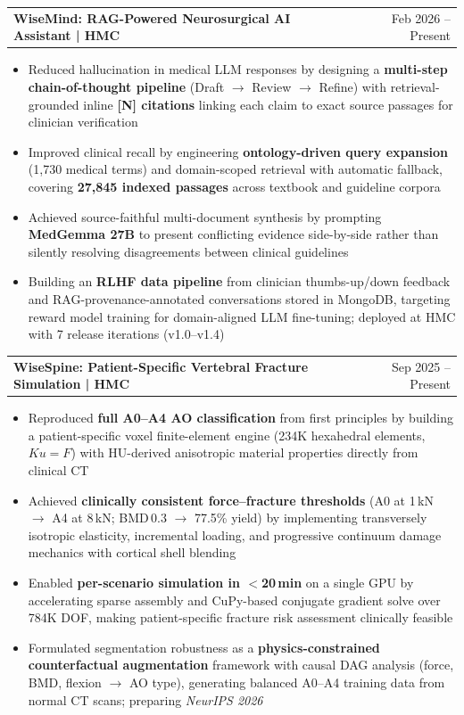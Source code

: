 \documentclass[a4paper,10pt]{article}
\makeatletter
\newenvironment{joblong}[2]
    {
    \begin{tabularx}{\linewidth}{@{}l X r@{}}
    \textbf{#1} & \hfill &  #2 \\[3.75pt]
    \end{tabularx}
    \begin{minipage}[t]{\linewidth}
    \begin{itemize}[nosep,after=\strut, leftmargin=1em, itemsep=3pt,label=--]
    }
    {
    \end{itemize}
    \end{minipage}    
    }
\makeatother
\begin{document}
\begin{joblong}{WiseMind: RAG-Powered Neurosurgical AI Assistant | HMC}{Feb 2026 -- Present}
\item Reduced hallucination in medical LLM responses by designing a \textbf{multi-step chain-of-thought pipeline} (Draft $\rightarrow$ Review $\rightarrow$ Refine) with retrieval-grounded inline \textbf{[N] citations} linking each claim to exact source passages for clinician verification
\item Improved clinical recall by engineering \textbf{ontology-driven query expansion} (1,730 medical terms) and domain-scoped retrieval with automatic fallback, covering \textbf{27,845 indexed passages} across textbook and guideline corpora
\item Achieved source-faithful multi-document synthesis by prompting \textbf{MedGemma 27B} to present conflicting evidence side-by-side rather than silently resolving disagreements between clinical guidelines
\item Building an \textbf{RLHF data pipeline} from clinician thumbs-up/down feedback and RAG-provenance-annotated conversations stored in MongoDB, targeting reward model training for domain-aligned LLM fine-tuning; deployed at HMC with 7 release iterations (v1.0--v1.4)
\end{joblong}

\vspace{-5pt}

\begin{joblong}{WiseSpine: Patient-Specific Vertebral Fracture Simulation | HMC}{Sep 2025 -- Present}
\item Reproduced \textbf{full A0--A4 AO classification} from first principles by building a patient-specific voxel finite-element engine (234K hexahedral elements, $Ku{=}F$) with HU-derived anisotropic material properties directly from clinical CT
\item Achieved \textbf{clinically consistent force--fracture thresholds} (A0 at 1\,kN $\rightarrow$ A4 at 8\,kN; BMD\,0.3 $\rightarrow$ 77.5\% yield) by implementing transversely isotropic elasticity, incremental loading, and progressive continuum damage mechanics with cortical shell blending
\item Enabled \textbf{per-scenario simulation in $<$20\,min} on a single GPU by accelerating sparse assembly and CuPy-based conjugate gradient solve over 784K DOF, making patient-specific fracture risk assessment clinically feasible
\item Formulated segmentation robustness as a \textbf{physics-constrained counterfactual augmentation} framework with causal DAG analysis (force, BMD, flexion $\rightarrow$ AO type), generating balanced A0--A4 training data from normal CT scans; preparing \textit{NeurIPS 2026}
\end{joblong}
\end{document}
